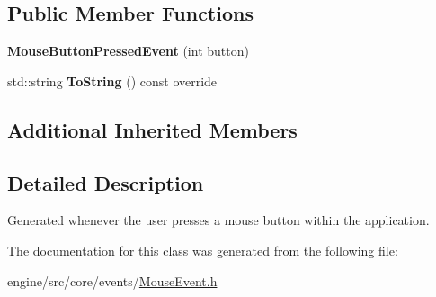 \subsection*{Public Member Functions}
\begin{DoxyCompactItemize}
\item 
\mbox{\label{classengine_1_1events_1_1MouseButtonPressedEvent_a5c49d839717df26588e125e3defd28db}} 
{\bfseries Mouse\+Button\+Pressed\+Event} (int button)
\item 
\mbox{\label{classengine_1_1events_1_1MouseButtonPressedEvent_a51cb2a71b84c923d4205331686f7dc7d}} 
std\+::string {\bfseries To\+String} () const override
\end{DoxyCompactItemize}
\subsection*{Additional Inherited Members}


\subsection{Detailed Description}
Generated whenever the user presses a mouse button within the application. 

The documentation for this class was generated from the following file\+:\begin{DoxyCompactItemize}
\item 
engine/src/core/events/\hyperlink{MouseEvent_8h}{Mouse\+Event.\+h}\end{DoxyCompactItemize}
